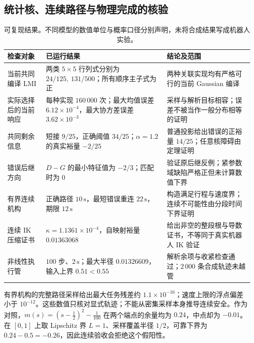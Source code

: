 \documentclass[UTF8,fontset=fandol,zihao=5,a4paper]{ctexart}
\theoremstyle{definition}
\theoremstyle{remark}\newtheorem{remark}[theorem]{说明}
\numberwithin{equation}{section}
\begin{document}
\subsection{统计核、连续路径与物理完成的核验}
\begin{table}[htbp]\centering\small
\begin{tabularx}{\linewidth}{p{.23\linewidth}p{.30\linewidth}Y}
\toprule 检查对象 & 已运行结果 & 结论及范围\\\midrule
当前共同编译 LMI &
两类 $5\times5$ 行列式分别为 $24/125,\ 131/500$；所有顺序主子式为正 &
两种关联实现均有严格可行的当前 Gaussian 编译\\
实际选择后的当前响应 &
每种实现 $160\,000$ 次；最大均值误差 $6.12\times10^{-4}$，最大协方差误差 $3.62\times10^{-3}$ &
采样与解析目标相容；误差不被当作一般分布相等的证明\\
共同剩余信息 &
短接 $9/25$，正确阈值 $34/25$；$\alpha=1.2$ 的真实裕量 $-2/25$ &
普通投影给出错误的正裕量 $14/25$；任意核障碍由定理证明\\
错误后继方向 &
$D-G$ 的最小特征值为 $-2/3$；匹配时为 $0$ &
验证原后继反例；紧参数域缺陷严格正但未计算数值下界\\
有界连续机构 &
正确路径 $10\,\mathrm s$，最短错误重连 $22\,\mathrm s$，期限 $12\,\mathrm s$ &
构造满足行程与速度界；连续不可能性由分段时间下界证明\\
连续 IK 压缩证书 &
$\kappa=1.1361\times10^{-4}$，自映射裕量 $0.01363068$ &
给出非空的整段根与导数证书，不等同于真实机器人 IK 验证\\
非线性执行管 &
$100$ 步、$2\,\mathrm s$；最大半径 $0.01326609$，输入上界 $0.51<0.55$ &
解析余项与收紧检查通过；$2\,000$ 条合成轨迹未越管\\
\bottomrule
\end{tabularx}
\caption{可复现结果。不同模型的数值单位与概率口径分别声明，未将合成结果写成机器人实验。}
\end{table}

有界机构的完整路径采样给出最大任务残差约 $1.1\times10^{-16}$；速度上限的浮点偏差小于 $10^{-12}$。这些数值只核对显式轨迹；不能从密集采样本身推导连续安全。作为对照，$m(s)=(s-\tfrac12)^2-\tfrac1{100}$ 在两个端点的余量均为 $0.24$，中点却为 $-0.01$。在 $[0,1]$ 上取 Lipschitz 界 $L=1$、采样覆盖半径 $1/2$，可靠下界为 $0.24-0.5=-0.26$，因此连续验收会拒绝这个假阳性。
\end{document}
